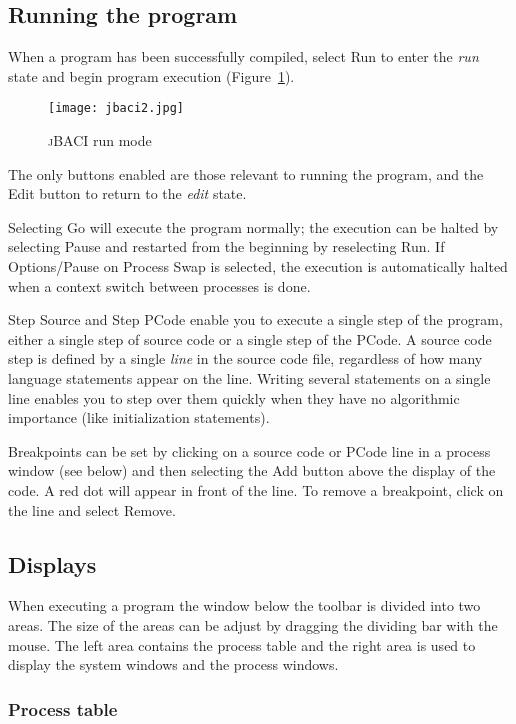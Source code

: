 \documentclass[11pt]{article}
\newcommand{\jb}{\textsc{\sffamily jBACI}}
\newcommand{\bu}[1]{\textsf{#1}}
\begin{document}
\subsection{Running the program}

When a program has been successfully compiled,
select \bu{Run} to enter the \emph{run} state and
begin program execution (Figure~\ref{fig.2}).
\begin{figure}[hb]
\begin{center}
\texttt{[image: jbaci2.jpg]}
\caption{\jb{} run mode}\label{fig.2}
\end{center}
\end{figure}
The only buttons enabled are those relevant to running the program,
and the \bu{Edit} button to return to the \emph{edit} state.

Selecting \bu{Go} will execute the program normally;
the execution can be halted by selecting \bu{Pause} and
restarted from the beginning by reselecting \bu{Run}.
If \bu{Options/Pause on Process Swap} is selected,
the execution is automatically halted when a context switch
between processes is done.

\bu{Step Source} and \bu{Step PCode} enable you to execute a single step
of the program, either a single step of source code or
a single step of the PCode.
A source code step is defined by a single \emph{line} in the source
code file, regardless of how many language statements appear on the line.
Writing several statements on a single line enables you to step
over them quickly when they
have no algorithmic importance (like initialization statements).

Breakpoints can be set by clicking on a source code
or PCode line in a process window (see below) and then
selecting the \bu{Add} button above the display of the code.
A red dot will appear in front of the line.
To remove a breakpoint, click on the line and select \bu{Remove}.

\subsection{Displays}

When executing a program the window below the toolbar is divided
into two areas. The size of the areas can be adjust by dragging
the dividing bar with the mouse.
The left area contains the process table and the right area is used
to display the system windows and the process windows.

\subsubsection{Process table}
\end{document}
